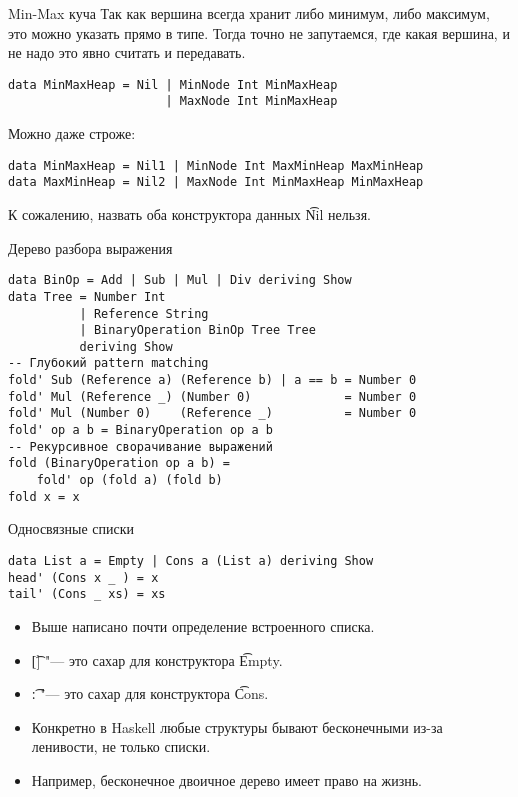 \begin{frame}[fragile]{Min-Max куча}
	Так как вершина всегда хранит либо минимум, либо максимум, это можно указать прямо в типе.
	Тогда точно не запутаемся, где какая вершина, и не надо это явно считать и передавать.
\begin{verbatim}
data MinMaxHeap = Nil | MinNode Int MinMaxHeap 
                      | MaxNode Int MinMaxHeap 
\end{verbatim}
	Можно даже строже:
\begin{verbatim}
data MinMaxHeap = Nil1 | MinNode Int MaxMinHeap MaxMinHeap
data MaxMinHeap = Nil2 | MaxNode Int MinMaxHeap MinMaxHeap
\end{verbatim}	
	К сожалению, назвать оба конструктора данных \t{Nil} нельзя.
\end{frame}

\begin{frame}[fragile]{Дерево разбора выражения}
\begin{verbatim}
data BinOp = Add | Sub | Mul | Div deriving Show
data Tree = Number Int
          | Reference String
          | BinaryOperation BinOp Tree Tree
          deriving Show
-- Глубокий pattern matching
fold' Sub (Reference a) (Reference b) | a == b = Number 0
fold' Mul (Reference _) (Number 0)             = Number 0
fold' Mul (Number 0)    (Reference _)          = Number 0
fold' op a b = BinaryOperation op a b
-- Рекурсивное сворачивание выражений
fold (BinaryOperation op a b) =
    fold' op (fold a) (fold b)
fold x = x
\end{verbatim}
\end{frame}

\begin{frame}[fragile]{Односвязные списки}
\begin{verbatim}
data List a = Empty | Cons a (List a) deriving Show
head' (Cons x _ ) = x
tail' (Cons _ xs) = xs
\end{verbatim}
	\begin{itemize}
		\item Выше написано почти определение встроенного списка.
		\item \t{[]} "--- это сахар для конструктора \t{Empty}.
		\item \t{:} "--- это сахар для конструктора \t{Cons}.
		\item Конкретно в Haskell любые структуры бывают бесконечными из-за ленивости, не только списки.
		\item Например, бесконечное двоичное дерево имеет право на жизнь.
	\end{itemize}
\end{frame}

